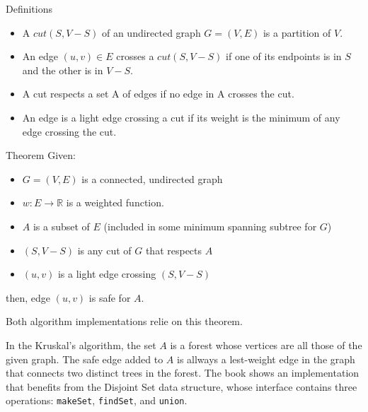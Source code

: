 \begin{frame}{Definitions}

  \begin{itemize}
   \item A {\color{blue}$cut(S, V-S)$} of an undirected graph $G = (V, E)$ is a partition of $V$. \pause 

   \item An {\color{blue}edge $(u, v) \in E$ crosses} a $cut(S, V-S)$ if one of its endpoints is in $S$ and
     the other is in $V-S$. \pause

   \item A {\color{blue}cut respects} a set A of edges if no edge in A crosses the cut. \pause
     
   \item An edge is a {\color{blue}light edge crossing} a cut if its weight is the minimum of any
     edge crossing the cut.  
  \end{itemize}
\end{frame}

\begin{frame}
  \begin{block}{Theorem}
    Given:
    \begin{itemize}
      \item $G = (V, E)$ is a connected, undirected graph
      \item $w : E \rightarrow \mathbb{R}$ is a weighted function.
      \item $A$ is a subset of $E$ (included in some minimum spanning subtree for $G$)
      \item $(S, V-S)$ is any cut of $G$ that respects $A$
      \item $(u, v)$ is a light edge crossing $(S, V-S)$
    \end{itemize}
    then, edge $(u, v)$ is safe for $A$. 
  \end{block}

  Both algorithm implementations relie on this theorem. 
\end{frame}

\begin{frame}
  In the Kruskal's algorithm, the set $A$ is a {\color{blue}forest}
  whose vertices are all those of the given graph. The safe edge
  added to $A$ is allways a lest-weight edge in the graph that
  connects two distinct trees in the forest. \pause The book
  shows an implementation that benefits from the Disjoint Set
  data structure, whose interface contains three operations:
  \texttt{makeSet}, \texttt{findSet}, and \texttt{union}. 
\end{frame}

